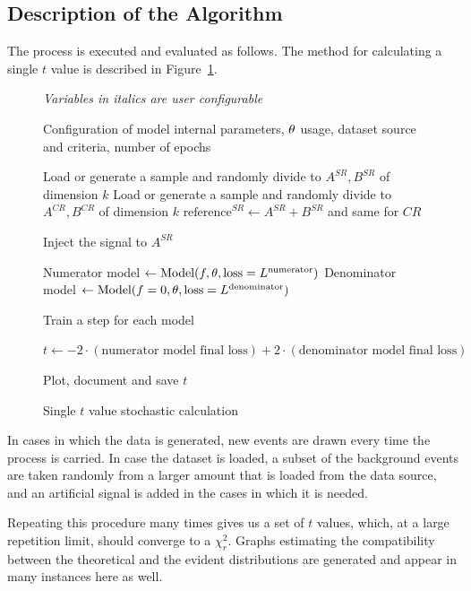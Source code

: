 \documentclass[paper/ddppaper2.tex]{subfiles}
\begin{document}
\subsection{Description of the Algorithm}
The process is executed and evaluated as follows. The method for calculating a single $t$ value is described in Figure~\ref{alg:single_train_algorithm}.

\begin{figure}
\caption{Single $t$ value stochastic calculation}
\label{alg:single_train_algorithm}
\begin{algorithmic}[1]

\Statex \textit{Variables in italics are user configurable}
\Statex %

\Require Configuration of model internal parameters, ${\theta}$ usage, dataset source and criteria, number of epochs

\State Load or generate a sample and randomly divide to $A^{SR}, B^{SR}$ of dimension $\mathit{k}$
\State Load or generate a sample and randomly divide to $A^{CR}, B^{CR}$ of dimension $\mathit{k}$
\State $\text{reference}^{SR} \gets A^{SR} + B^{SR}$ and same for $CR$

    \State Inject the signal to $A^{SR}$
\EndIf

\State Numerator model $\gets \text{Model}(f, {\theta}, \text{loss} = L^{\text{numerator}})$
\State Denominator model $\gets \text{Model}(f = 0, {\theta}, \text{loss} = L^{\text{denominator}})$

    \State Train a step for each model
\EndFor

\State $t \gets -2 \cdot (\text{numerator model final loss}) + 2 \cdot (\text{denominator model final loss})$

\State Plot, document and save
\State \Return $t$

\end{algorithmic}
\end{figure}

In cases in which the data is generated, new events are drawn every time the process is carried. In case the dataset is loaded, a subset of the background events are taken randomly from a larger amount that is loaded from the data source, and an artificial signal is added in the cases in which it is needed.

Repeating this procedure many times gives us a set of $t$ values, which, at a large repetition limit, should converge to a $\chi^2_r$. Graphs estimating the compatibility between the theoretical and the evident distributions are generated and appear in many instances here as well.
\end{document}
